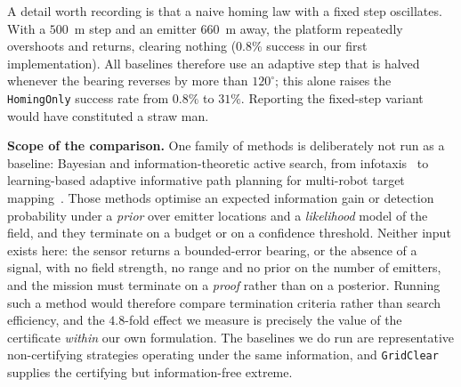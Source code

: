 \documentclass[preprint,12pt,3p]{elsarticle}
\theoremstyle{definition}
\begin{document}
A detail worth recording is that a naive homing law with a fixed step oscillates. With a $500$~m
step and an emitter $660$~m away, the platform repeatedly overshoots and returns, clearing
nothing ($0.8\%$ success in our first implementation). All baselines therefore use an adaptive
step that is halved whenever the bearing reverses by more than $120^\circ$; this alone raises the
\texttt{HomingOnly} success rate from $0.8\%$ to $31\%$. Reporting the fixed-step variant would
have constituted a straw man.

\noindent\textbf{Scope of the comparison.} One family of methods is deliberately not run as a
baseline: Bayesian and information-theoretic active search, from
infotaxis~\cite{vergassola2007} to learning-based adaptive informative path planning for
multi-robot target mapping~\cite{popovic2024,vashisth2026}. Those methods optimise an expected information gain or detection
probability under a \emph{prior} over emitter locations and a \emph{likelihood} model of the
field, and they terminate on a budget or on a confidence threshold. Neither input exists here:
the sensor returns a bounded-error bearing, or the absence of a signal, with no field strength,
no range and no prior on the number of emitters, and the mission must terminate on a
\emph{proof} rather than on a posterior. Running such a method would therefore compare
termination criteria rather than search efficiency, and the $4.8$-fold effect we measure is
precisely the value of the certificate \emph{within} our own formulation. The baselines we do
run are representative non-certifying strategies operating under the same information, and
\texttt{GridClear} supplies the certifying but information-free extreme.
\end{document}
